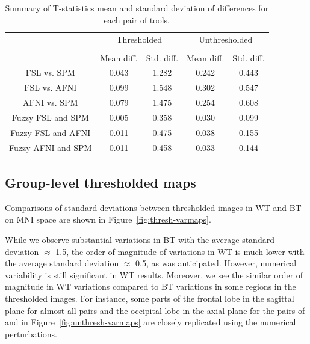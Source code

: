 \documentclass[conference]{IEEEtran}
\begin{document}
\setlength{\tabcolsep}{5pt}
\begin{table}[h]
    \centering
    \begin{tabular}{ccc|cc}
        \toprule
        \multirow{2}{*}{} & \multicolumn{2}{c}{Thresholded} & \multicolumn{2}{c}{Unthresholded} \\
        \cmidrule{2-3} \cmidrule{4-5} \\
        {} & Mean diff. & Std. diff. & Mean diff. & Std. diff. \\
        \midrule
        \rowcolor{lightgray}
        FSL vs. SPM          &  0.043       & 1.282      & 0.242     & 0.443  \\
        \rowcolor{lightgray}
        FSL vs. AFNI         &  0.099       & 1.548      & 0.302     & 0.547  \\
        \rowcolor{lightgray}
        AFNI vs. SPM         &  0.079       & 1.475      & 0.254     & 0.608  \\
        Fuzzy FSL and SPM    &  0.005       & 0.358      & 0.030     & 0.099  \\
        Fuzzy FSL and AFNI   &  0.011       & 0.475      & 0.038     & 0.155  \\
        Fuzzy AFNI and SPM   &  0.011       & 0.458      & 0.033     & 0.144  \\
        \bottomrule
    \end{tabular}
    \caption{Summary of T-statistics mean and standard deviation of differences for each pair of tools.}
    \label{table:pipeline-stats}
\end{table}


\subsection{Group-level thresholded maps}

Comparisons of standard deviations between thresholded images in WT and BT
on MNI space are shown in Figure~\ref{fig:thresh-varmaps}.

While we observe substantial variations in BT with the average standard deviation $\approx$ 1.5,
the order of magnitude of variations in WT is much lower with the average standard deviation $\approx$ 0.5,
as was anticipated. However, numerical variability is still significant in WT results.
Moreover, we see the similar order of magnitude in WT variations compared to BT variations
in some regions in the thresholded images.
For instance, some parts of the frontal lobe in the sagittal plane for almost all pairs and the occipital lobe in the axial plane
for the pairs of \fslspm and \fslafni in Figure~\ref{fig:unthresh-varmaps}
are closely replicated using the numerical perturbations. 
\end{document}
